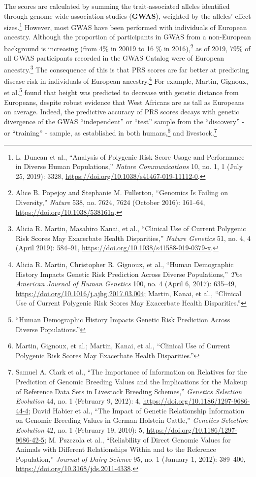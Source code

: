 \documentclass[
  9pt,
]{book}
\begin{document}
The scores are calculated by summing the trait-associated alleles identified through genome-wide association studies (\textbf{GWAS}), weighted by the alleles' effect sizes.\footnote{L. Duncan et al., {``Analysis of Polygenic Risk Score Usage and Performance in Diverse Human Populations,''} \emph{Nature Communications} 10, no. 1, 1 (July 25, 2019): 3328, \url{https://doi.org/10.1038/s41467-019-11112-0}.} However, most GWAS have been performed with individuals of European ancestry. Although the proportion of participants in GWAS from a non-European background is increasing (from 4\% in 20019 to 16 \% in 2016),\footnote{Alice B. Popejoy and Stephanie M. Fullerton, {``Genomics Is Failing on Diversity,''} \emph{Nature} 538, no. 7624, 7624 (October 2016): 161--64, \url{https://doi.org/10.1038/538161a}.} as of 2019, 79\% of all GWAS participants recorded in the GWAS Catalog were of European ancestry.\footnote{Alicia R. Martin, Masahiro Kanai, et al., {``Clinical Use of Current Polygenic Risk Scores May Exacerbate Health Disparities,''} \emph{Nature Genetics} 51, no. 4, 4 (April 2019): 584--91, \url{https://doi.org/10.1038/s41588-019-0379-x}.} The consequence of this is that PRS scores are far better at predicting disease risk in individuals of European ancestry.\footnote{Alicia R. Martin, Christopher R. Gignoux, et al., {``Human {Demographic History Impacts Genetic Risk Prediction} Across {Diverse Populations},''} \emph{The American Journal of Human Genetics} 100, no. 4 (April 6, 2017): 635--49, \url{https://doi.org/10.1016/j.ajhg.2017.03.004}; Martin, Kanai, et al., {``Clinical Use of Current Polygenic Risk Scores May Exacerbate Health Disparities.''}} For example, Martin, Gignoux, et al.\footnote{{``Human {Demographic History Impacts Genetic Risk Prediction} Across {Diverse Populations}.''}} found that height was predicted to decrease with genetic distance from Europeans, despite robust evidence that West Africans are as tall as Europeans on average. Indeed, the predictive accuracy of PRS scores decays with genetic divergence of the GWAS ``independent'' or ``test'' sample from the ``discovery'' - or ``training'' - sample, as established in both humans,\footnote{Martin, Gignoux, et al.; Martin, Kanai, et al., {``Clinical Use of Current Polygenic Risk Scores May Exacerbate Health Disparities.''}} and livestock.\footnote{Samuel A. Clark et al., {``The Importance of Information on Relatives for the Prediction of Genomic Breeding Values and the Implications for the Makeup of Reference Data Sets in Livestock Breeding Schemes,''} \emph{Genetics Selection Evolution} 44, no. 1 (February 9, 2012): 4, \url{https://doi.org/10.1186/1297-9686-44-4}; David Habier et al., {``The Impact of Genetic Relationship Information on Genomic Breeding Values in {German Holstein} Cattle,''} \emph{Genetics Selection Evolution} 42, no. 1 (February 19, 2010): 5, \url{https://doi.org/10.1186/1297-9686-42-5}; M. Pszczola et al., {``Reliability of Direct Genomic Values for Animals with Different Relationships Within and to the Reference Population,''} \emph{Journal of Dairy Science} 95, no. 1 (January 1, 2012): 389--400, \url{https://doi.org/10.3168/jds.2011-4338}.}
\end{document}
